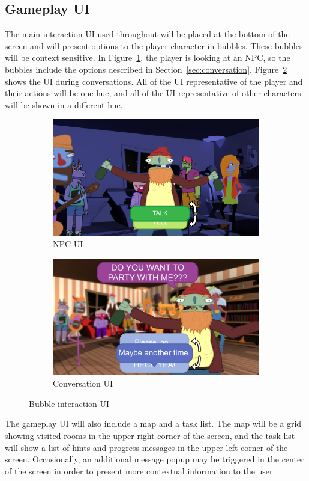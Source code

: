 \subsection{Gameplay UI}
\label{sec:UI_Gameplay}
The main interaction UI used throughout \ourgame{} will be placed at the bottom of the screen and will present options to the player character in bubbles. These bubbles will be context sensitive. In Figure~\ref{fig:UI_npc_talk}, the player is looking at an NPC, so the bubbles include the options described in Section~\ref{sec:conversation}. Figure~\ref{fig:UI_npc_conversation} shows the UI during conversations. All of the UI representative of the player and their actions will be one hue, and all of the UI representative of other characters will be shown in a different hue.

\begin{figure}[htb]
  \centering\begin{subfigure}{.33\textwidth}
    \centering
    \includegraphics[width=.9\linewidth]{images/UI_npc_talk}
    \caption{NPC UI}
  	\label{fig:UI_npc_talk}
  \end{subfigure}%
  \begin{subfigure}{.33\textwidth}
    \centering
    \includegraphics[width=.9\linewidth]{images/UI_npc_conversation}
    \caption{Conversation UI}
  	\label{fig:UI_npc_conversation}
  \end{subfigure}%
  \caption{Bubble interaction UI}
  \label{fig:gameplay_UI}
\end{figure}

The gameplay UI will also include a map and a task list. The map will be a grid showing visited rooms in the upper-right corner of the screen, and the task list will show a list of hints and progress messages in the upper-left corner of the screen. Occasionally, an additional message popup may be triggered in the center of the screen in order to present more contextual information to the user.